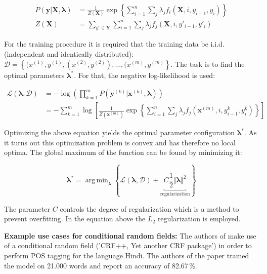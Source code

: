 \documentclass[twocolumns]{IEEEtran}
\DeclareMathOperator*{\argmin}{arg\,min}
\begin{document}
{\footnotesize
\begin{align*}
    P(\bm{y} \vert \bm{X}, \bm{\lambda})
        &=  \frac{1}{Z(\bm{X})}\exp\left\{
                \sum_{i=1}^n \sum_j \lambda_j f_i(\bm{X}, i, y_{i-1}, y_i)
            \right\} \\
    Z(\bm{X})
        &=  \sum_{y' \in \bm{Y}} \sum_{i=1}^n \sum_j \lambda_j f_j(\bm{X}, i, y'_{i-1}, y'_i) 
\end{align*}}

For the training procedure it is required that the training data be i.i.d. (independent and identically distributed): $\mathcal{D} = \left\{ (x^{(1)}, y^{(1)}, (x^{(2)}, y^{(2)}), \dots, (x^{(m)}, y^{(m)}\right\}$. The task is to find the optimal parameters $\bm{\lambda}^*$. For that, the negative log-likelihood is used:

{\scriptsize
\begin{align*}
    \mathcal{L}(\bm{\lambda}, \mathcal{D})
        &= -\log\left(
            \prod_{k=1}^m P(\bm{y}^{(k)} \vert \bm{x}^{(k)}, \bm{\lambda})
        \right) \\
        &= -\sum_{k=1}^m \log\left[
            \frac{1}{Z(\bm{x}^{(m)})}\exp\left\{
                \sum_{i=1}^n \sum_j \lambda_j f_j(\bm{x}^{(m)}, i, y_{i-1}^k, y_i^k)
            \right\}
        \right]
\end{align*}}

Optimizing the above equation yields the optimal parameter configuration $\bm{\lambda}^*$. As it turns out this optimization problem is convex and has therefore no local optima. The global maximum of the function can be found by minimizing it:

\begin{equation*}
    \bm{\lambda}^* = \argmin_{\bm{\lambda}} \left\{
        \mathcal{L}(\bm{\lambda}, \mathcal{D}) + \underbracket{
            C \frac{1}{2} \Vert \bm{\lambda} \Vert^2
        }_{\text{regularization}}
    \right\}
\end{equation*}

The parameter $C$ controls the degree of regularization which is a method to prevent overfitting. In the equation above the $L_2$ regularization is employed.


\vspace*{3mm}
\textbf{Example use cases for conditional random fields:}
The authors of \cite{Avinesh2006} make use of a conditional random field ('CRF++, Yet another CRF package') in order to perform POS tagging for the language Hindi. The authors of the paper trained the model on 21.000 words and report an accuracy of 82.67\,\%.
\end{document}
